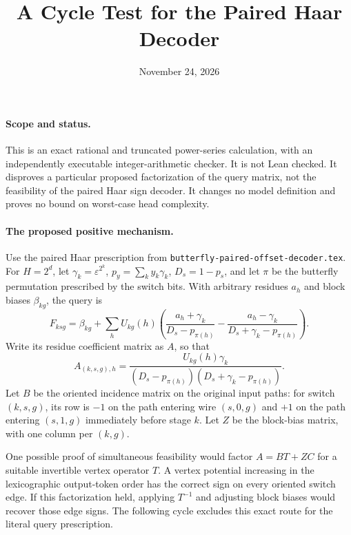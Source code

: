\documentclass[11pt]{article}
\begin{document}
\title{A Cycle Test for the Paired Haar Decoder}
\author{}\date{November 24, 2026}\maketitle

\paragraph{Scope and status.}
This is an exact rational and truncated power-series calculation, with an
independently executable integer-arithmetic checker. It is not Lean checked.
It disproves a particular proposed factorization of the query matrix, not
the feasibility of the paired Haar sign decoder. It changes no model
definition and proves no bound on worst-case head complexity.

\paragraph{The proposed positive mechanism.}
Use the paired Haar prescription from
\texttt{butterfly-paired-offset-decoder.tex}. For $H=2^d$, let
$\gamma_k=\varepsilon^{2^k}$,
$p_y=\sum_k y_k\gamma_k$, $D_s=1-p_s$, and let $\pi$ be the butterfly
permutation prescribed by the switch bits. With arbitrary residues
$a_h$ and block biases $\beta_{kg}$, the query is
\[
 F_{ksg}=\beta_{kg}+\sum_h U_{kg}(h)
 \left(\frac{a_h+\gamma_k}{D_s-p_{\pi(h)}}
 -\frac{a_h-\gamma_k}{D_s+\gamma_k-p_{\pi(h)}}\right).
\]
Write its residue coefficient matrix as $A$, so that
\[
 A_{(k,s,g),h}=
 \frac{U_{kg}(h)\gamma_k}
 {(D_s-p_{\pi(h)})(D_s+\gamma_k-p_{\pi(h)})}.
\]
Let $B$ be the oriented incidence matrix on the original input paths:
for switch $(k,s,g)$, its row is $-1$ on the path entering wire
$(s,0,g)$ and $+1$ on the path entering $(s,1,g)$ immediately before
stage $k$. Let $Z$ be the block-bias matrix, with one column per $(k,g)$.

One possible proof of simultaneous feasibility would factor
$A=BT+ZC$ for a suitable invertible vertex operator $T$. A vertex
potential increasing in the lexicographic output-token order has the
correct sign on every oriented switch edge. If this factorization held,
applying $T^{-1}$ and adjusting block biases would recover those edge
signs. The following cycle excludes this exact route for the literal
query prescription.
\end{document}
